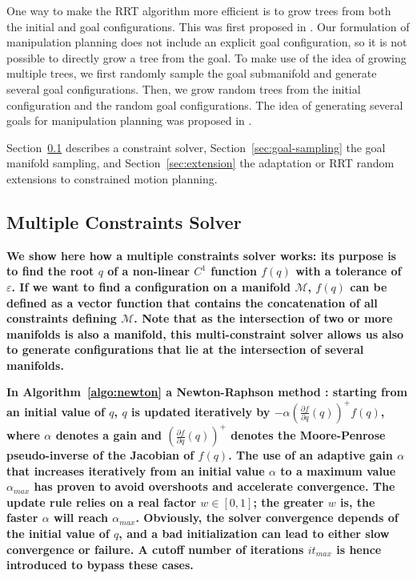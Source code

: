 \documentclass{article}
\newcommand\manifold{\mathcal{M}}
\begin{document}
One way to make the RRT algorithm more efficient is to grow trees from both the initial
and  goal configurations. This was first proposed in 
\cite{kuffner00rrtconnect}. Our formulation of manipulation planning does
not include an explicit goal configuration, so it is not possible to directly grow
a tree from the goal. To make use of the idea of growing multiple trees, we first
randomly sample the goal submanifold and generate several goal configurations. Then, 
we grow random
trees from the initial configuration and the random goal configurations. The idea of
generating several goals for manipulation planning was proposed in \cite{diankov2008bpc}.

Section~\ref{sec:constraint-solver} describes a constraint solver,
Section~\ref{sec:goal-sampling} the goal manifold sampling, and
Section~\ref{sec:extension} the adaptation or RRT random extensions to
constrained motion planning.

\subsection{Multiple Constraints Solver}
\label{sec:constraint-solver}

\textbf{We show here how a multiple constraints solver works: its
  purpose is to find the root $q$ of a non-linear $C^1$ function
  $f(q)$ with a tolerance of $\varepsilon$. If we want to find a
  configuration on a manifold $\manifold$, $f(q)$ can be defined as a
  vector function that contains the concatenation of all constraints
  defining $\manifold$. Note that as the intersection of two or more
  manifolds is also a manifold, this multi-constraint solver allows us
  also to generate configurations that lie at the intersection of
  several manifolds.}

\textbf{In Algorithm~\ref{algo:newton} a Newton-Raphson method
  \cite{bonnans2006numerical}: starting from an initial value of $q$,
  $q$ is updated iteratively by $- \alpha \left(\frac{\partial
    f}{\partial q}(q)\right)^{+} f(q)$, where $\alpha$ denotes a gain
  and $\left(\frac{\partial f}{\partial q}(q)\right)^{+}$ denotes the
  Moore-Penrose pseudo-inverse of the Jacobian of $f(q)$. The use of
  an adaptive gain $\alpha$ that increases iteratively from an initial
  value $\alpha$ to a maximum value $\alpha_{max}$ has proven to avoid
  overshoots and accelerate convergence. The update rule relies on a
  real factor $w \in [0,1]$; the greater $w$ is, the faster $\alpha$
  will reach $\alpha_{max}$. Obviously, the solver convergence depends
  of the initial value of $q$, and a bad initialization can lead to
  either slow convergence or failure. A cutoff number of iterations
  $it_{max}$ is hence introduced to bypass these cases.}
\end{document}
